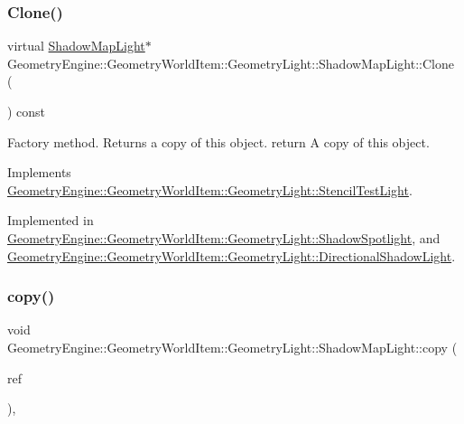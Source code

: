 \subsubsection{\texorpdfstring{Clone()}{Clone()}}
{\footnotesize\ttfamily virtual \mbox{\hyperlink{class_geometry_engine_1_1_geometry_world_item_1_1_geometry_light_1_1_shadow_map_light}{Shadow\+Map\+Light}}$\ast$ Geometry\+Engine\+::\+Geometry\+World\+Item\+::\+Geometry\+Light\+::\+Shadow\+Map\+Light\+::\+Clone (\begin{DoxyParamCaption}{ }\end{DoxyParamCaption}) const\hspace{0.3cm}{\ttfamily [pure virtual]}}

Factory method. Returns a copy of this object. return A copy of this object. 

Implements \mbox{\hyperlink{class_geometry_engine_1_1_geometry_world_item_1_1_geometry_light_1_1_stencil_test_light_a6434a228dc64537ff9984c82eaf8ab07}{Geometry\+Engine\+::\+Geometry\+World\+Item\+::\+Geometry\+Light\+::\+Stencil\+Test\+Light}}.



Implemented in \mbox{\hyperlink{class_geometry_engine_1_1_geometry_world_item_1_1_geometry_light_1_1_shadow_spotlight_a0ea8fd05d26f6e780d352168c28f940d}{Geometry\+Engine\+::\+Geometry\+World\+Item\+::\+Geometry\+Light\+::\+Shadow\+Spotlight}}, and \mbox{\hyperlink{class_geometry_engine_1_1_geometry_world_item_1_1_geometry_light_1_1_directional_shadow_light_ae5016cad41a62c4c870a942acc3f9afe}{Geometry\+Engine\+::\+Geometry\+World\+Item\+::\+Geometry\+Light\+::\+Directional\+Shadow\+Light}}.

\mbox{\label{class_geometry_engine_1_1_geometry_world_item_1_1_geometry_light_1_1_shadow_map_light_a778fdb3b00c8b930e03ebbde77c9433c}} 
\subsubsection{\texorpdfstring{copy()}{copy()}}
{\footnotesize\ttfamily void Geometry\+Engine\+::\+Geometry\+World\+Item\+::\+Geometry\+Light\+::\+Shadow\+Map\+Light\+::copy (\begin{DoxyParamCaption}\item[{const \mbox{\hyperlink{class_geometry_engine_1_1_geometry_world_item_1_1_geometry_light_1_1_shadow_map_light}{Shadow\+Map\+Light}} \&}]{ref }\end{DoxyParamCaption})\hspace{0.3cm}{\ttfamily [protected]}, {\ttfamily [virtual]}}

